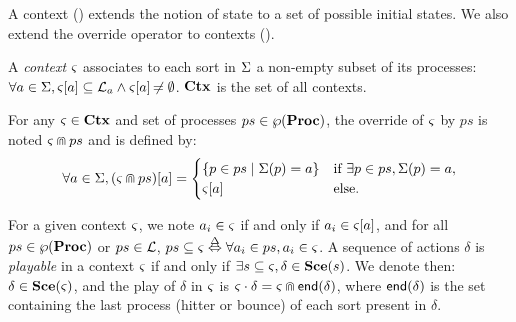 A context () extends the notion of state to a set of possible initial states.
We also extend the override operator to contexts ().
\begin{definition}
\label{def:context}
  A \emph{context} $\varsigma$ associates to each sort in $\Sigma$ a non-empty subset of its processes:
  $\forall a \in \Sigma, {\varsigma[a]} \subseteq \mathcal{L}_a \wedge {\varsigma[a]} \not\nobreak\mkern -2mu = \emptyset$.
  $\mathbf{Ctx}$ is the set of all contexts.
\end{definition}
%
\begin{definition}[$\Cap: \Ctx \times \powerset(\PHproc) \rightarrow \Ctx$]
\label{def:ctxcap}
  For any $\varsigma\in\mathbf{Ctx}$ and set of processes $ps \in \wp(\mathbf{Proc})$,
  the override of $\varsigma$ by $ps$ is noted $\varsigma \Cap ps$ and is defined by:
  \[ \forall a \in \Sigma, {(\varsigma \Cap ps)[a]} =
  \begin{cases}
    \{ p \in ps \mid \Sigma(p)=a \} & \text{if } \exists p \in ps, \Sigma(p)=a,\\
    {\varsigma[a]} & \text{else.}
  \end{cases}
  \]
\end{definition}
\noindent
For a given context $\varsigma$, we note $a_i \in \varsigma$ if and only if $a_i \in {\varsigma[a]}$,
and for all $ps \in \wp(\mathbf{Proc})$ or $ps \in \mathcal{L}$, $ps \subseteq \varsigma \stackrel{\Delta}\Leftrightarrow \forall a_i \in ps, a_i \in \varsigma$.
A sequence of actions $\delta$ is \emph{playable} in a context $\varsigma$ if and only if 
$\exists s \subseteq \varsigma, \delta \in \mathbf{Sce}(s)$.
We denote then: $\delta \in \mathbf{Sce}(\varsigma)$,
and the play of $\delta$ in $\varsigma$ is $\varsigma \cdot \delta = \varsigma \Cap \mathsf{end}(\delta)$,
where $\mathsf{end}(\delta)$ is the set containing the last process (hitter or bounce) of each sort present in $\delta$.


